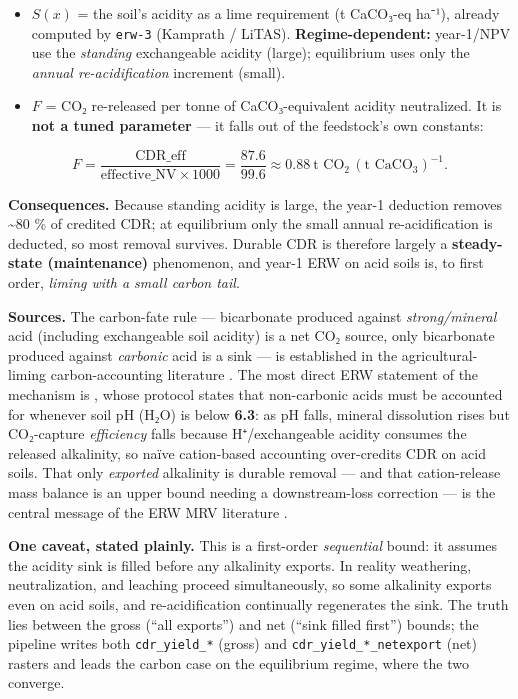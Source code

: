 \documentclass[openany]{book}
\providecommand{\tightlist}{%
  \setlength{\itemsep}{0pt}\setlength{\parskip}{0pt}}
\begin{document}
\begin{itemize}
\tightlist
\item
  \(S(x)\) = the soil's acidity as a lime requirement (t CaCO₃-eq ha⁻¹), already
  computed by \texttt{erw-3} (Kamprath / LiTAS). \textbf{Regime-dependent:}
  year-1/NPV use the \emph{standing} exchangeable acidity (large); equilibrium
  uses only the \emph{annual re-acidification} increment (small).
\item
  \(F\) = CO₂ re-released per tonne of CaCO₃-equivalent acidity neutralized. It
  is \textbf{not a tuned parameter} --- it falls out of the feedstock's own
  constants:
\end{itemize}

\[
F = \frac{\text{CDR\_eff}}{\text{effective\_NV}\times 1000}
  = \frac{87.6}{99.6} \approx \mathbf{0.88}\ \text{t CO}_2\,(\text{t CaCO}_3)^{-1}.
\]

\textbf{Consequences.} Because standing acidity is large, the year-1 deduction
removes \textasciitilde80 \% of credited CDR; at equilibrium only the small
annual re-acidification is deducted, so most removal survives. Durable CDR is
therefore largely a \textbf{steady-state (maintenance)} phenomenon, and year-1
ERW on acid soils is, to first order, \emph{liming with a small carbon tail}.

\textbf{Sources.} The carbon-fate rule --- bicarbonate produced against
\emph{strong/mineral} acid (including exchangeable soil acidity) is a net CO₂
source, only bicarbonate produced against \emph{carbonic} acid is a sink --- is
established in the agricultural-liming carbon-accounting literature
\citep{west2005, hamilton2007}. The most direct ERW statement of the mechanism
is \citet{dietzen2023}, whose protocol states that non-carbonic acids must be
accounted for whenever soil pH (H₂O) is below \textbf{6.3}: as pH falls, mineral
dissolution rises but CO₂-capture \emph{efficiency} falls because
H⁺/exchangeable acidity consumes the released alkalinity, so naïve cation-based
accounting over-credits CDR on acid soils. That only \emph{exported} alkalinity
is durable removal --- and that cation-release mass balance is an upper bound
needing a downstream-loss correction --- is the central message of the ERW MRV
literature \citep{reershemius2023, suhrhoff2024, zhang2022, kanzaki2023,
levy2024}.

\textbf{One caveat, stated plainly.} This is a first-order \emph{sequential}
bound: it assumes the acidity sink is filled before any alkalinity exports. In
reality weathering, neutralization, and leaching proceed simultaneously, so some
alkalinity exports even on acid soils, and re-acidification continually
regenerates the sink. The truth lies between the gross (``all exports'') and net
(``sink filled first'') bounds; the pipeline writes both \texttt{cdr\_yield\_*}
(gross) and \texttt{cdr\_yield\_*\_netexport} (net) rasters and leads the carbon
case on the equilibrium regime, where the two converge.
\end{document}
